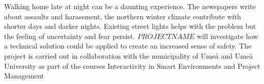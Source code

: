 \documentclass[twoside]{report}
\begin{document}
\begin{siderules}
Walking home late at night can be a daunting experience. The newspapers write
about assaults and harassment, the northern winter climate contribute with
shorter days and darker nights. Existing street lights helps with the problem
but the feeling of uncertainty and fear persist. $PROJECTNAME$ will investigate
how a technical solution could be applied to create an increased sense of
safety. The project is carried out in collaboration with the municipality of
Umeå and Umeå University as part of the courses Interactivity in Smart
Environments and Project Management
\end{siderules}


\lipsum[4]
\end{document}
